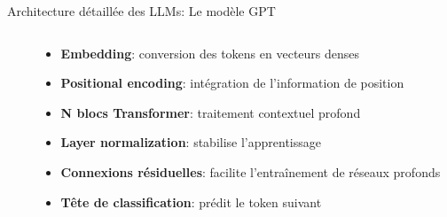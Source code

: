 \documentclass[aspectratio=169]{beamer}
\begin{document}
\begin{frame}{Architecture détaillée des LLMs: Le modèle GPT}
\begin{columns}
\begin{column}{0.4\textwidth}
\begin{center}
            \end{center}
        \end{column}
        \begin{column}{0.6\textwidth}
            \begin{itemize}
                \item \textbf{Embedding}: conversion des tokens en vecteurs denses
                \item \textbf{Positional encoding}: intégration de l'information de position
                \item \textbf{N blocs Transformer}: traitement contextuel profond
                \item \textbf{Layer normalization}: stabilise l'apprentissage
                \item \textbf{Connexions résiduelles}: facilite l'entraînement de réseaux profonds
                \item \textbf{Tête de classification}: prédit le token suivant
            \end{itemize}
        \end{column}
    \end{columns}
\end{frame}
\end{document}
